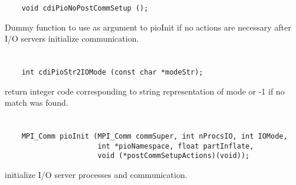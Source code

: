 \begin{verbatim}
    void cdiPioNoPostCommSetup ();
\end{verbatim}

Dummy function to use as argument to pioInit
if no actions are necessary after I/O servers initialize communication.


\section*{\tt {}}

\begin{verbatim}
    int cdiPioStr2IOMode (const char *modeStr);
\end{verbatim}

return integer code corresponding to string
representation of mode or -1 if no match was found.


\section*{\tt {}}

\begin{verbatim}
    MPI_Comm pioInit (MPI_Comm commSuper, int nProcsIO, int IOMode,
                      int *pioNamespace, float partInflate,
                      void (*postCommSetupActions)(void));
\end{verbatim}

initialize I/O server processes and communication.


